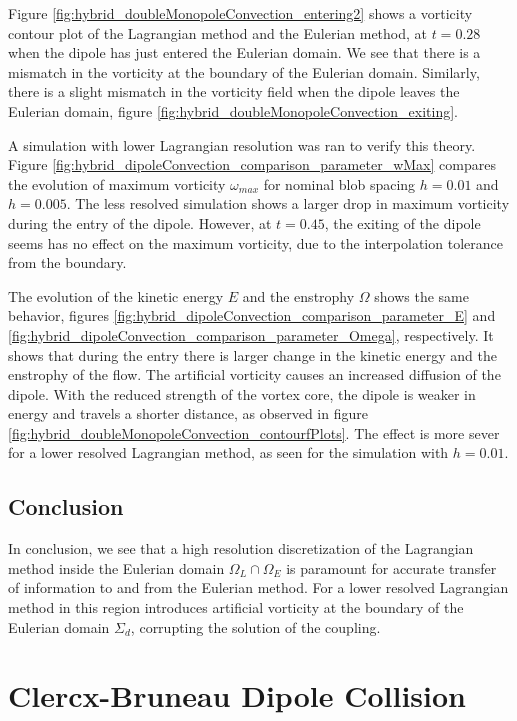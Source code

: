 Figure \ref{fig:hybrid_doubleMonopoleConvection_entering2} shows a vorticity contour plot of the Lagrangian method and the Eulerian method, at $t=0.28$ when the dipole has just entered the Eulerian domain. We see that there is a mismatch in the vorticity at the boundary of the Eulerian domain. Similarly, there is a slight mismatch in the vorticity field when the dipole leaves the Eulerian domain, figure \ref{fig:hybrid_doubleMonopoleConvection_exiting}.

A simulation with lower Lagrangian resolution was ran to verify this theory. Figure \ref{fig:hybrid_dipoleConvection_comparison_parameter_wMax} compares the evolution of maximum vorticity $\omega_{max}$ for nominal blob spacing $h=0.01$ and $h=0.005$. The less resolved simulation shows a larger drop in maximum vorticity during the entry of the dipole. However, at $t=0.45$, the exiting of the dipole seems has no effect on the maximum vorticity, due to the interpolation tolerance from the boundary.

The evolution of the kinetic energy $E$ and the enstrophy $\Omega$ shows the same behavior, figures \ref{fig:hybrid_dipoleConvection_comparison_parameter_E} and  \ref{fig:hybrid_dipoleConvection_comparison_parameter_Omega}, respectively. It shows that during the entry there is larger change in the kinetic energy and the enstrophy of the flow. The artificial vorticity causes an increased diffusion of the dipole. With the reduced strength of the vortex core, the dipole is weaker in energy and travels a shorter distance, as observed in figure \ref{fig:hybrid_doubleMonopoleConvection_contourfPlots}. The effect is more sever for a lower resolved Lagrangian method, as seen for the simulation with $h=0.01$.

\subsection{Conclusion}

In conclusion, we see that a high resolution discretization of the Lagrangian method inside the Eulerian domain $\Omega_L \cap \Omega_E$ is paramount for accurate transfer of information to and from the Eulerian method. For a lower resolved Lagrangian method in this region introduces artificial vorticity at the boundary of the Eulerian domain $\Sigma_d$, corrupting the solution of the coupling.

\section{Clercx-Bruneau Dipole Collision}
\label{sec:vvhm-cbdcoll}

